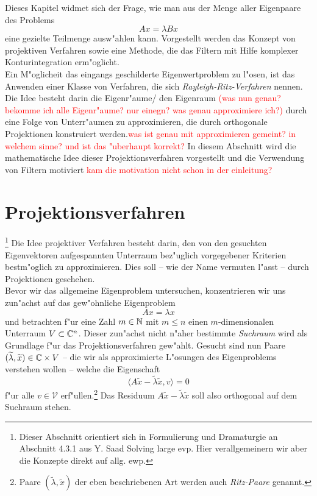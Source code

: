 Dieses Kapitel widmet sich der Frage, wie man aus der Menge aller Eigenpaare
des Problems
\[
Ax = \lambda Bx
\]
eine gezielte Teilmenge ausw"ahlen kann. Vorgestellt werden das Konzept von projektiven Verfahren
sowie eine Methode, die das Filtern mit Hilfe komplexer Konturintegration erm"oglicht.\\

Ein M"oglicheit das eingangs geschilderte Eigenwertproblem zu l"osen, ist
das Anwenden einer Klasse von Verfahren, die sich \emph{Rayleigh-Ritz-Verfahren}
nennen. Die Idee besteht darin die Eigenr"aume/ den Eigenraum \textcolor{red}{(was nun genau? bekomme ich alle
Eigenr"aume? nur einegn? was genau approximiere ich?)} durch eine Folge von Unterr"aumen
zu approximieren, die durch orthogonale Projektionen konstruiert werden.\textcolor{red}{was ist genau
mit approximieren gemeint? in welchem sinne? und ist das "uberhaupt korrekt?} In diesem
Abschnitt wird die mathematische Idee dieser Projektionsverfahren vorgestellt und
die Verwendung von Filtern motiviert \textcolor{red}{kam die motivation nicht schon
in der einleitung?}

\section{Projektionsverfahren}
\footnote{Dieser Abschnitt orientiert sich in Formulierung und Dramaturgie an Abschnitt 4.3.1 aus Y. Saad Solving large evp. Hier verallgemeinern wir aber die Konzepte direkt auf allg. ewp.}
Die Idee projektiver Verfahren besteht darin, den von den gesuchten Eigenvektoren aufgespannten
Unterraum bez"uglich vorgegebener Kriterien bestm"oglich zu approximieren. Dies soll --
wie der Name vermuten l"asst -- durch Projektionen geschehen.\\

Bevor wir das allgemeine Eigenproblem untersuchen, konzentrieren wir uns zun"achst auf das gew"ohnliche Eigenproblem
\[
Ax = \lambda x%
\]
und betrachten f"ur eine Zahl $m\in\mathbb{N}$ mit $m\le n$
einen $m$-dimensionalen Unterraum $V\subset\mathbb{C}^n$. Dieser zun"achst nicht
n"aher bestimmte \emph{Suchraum} wird als Grundlage f"ur das Projektionsverfahren gew"ahlt.
Gesucht sind nun Paare $(\widetilde{\lambda}, \widetilde{x})\in\mathbb{C}\times V$ -- die wir als approximierte L"osungen des Eigenproblems verstehen wollen --
welche die Eigenschaft
\begin{equation}\label{eq:orthogonal}
\langle A\widetilde{x} - \widetilde{\lambda}\widetilde{x}, v\rangle=0
\end{equation}
f"ur alle $v \in \mathcal{V} $ erf"ullen.\footnote{Paare $(\widetilde{\lambda}, \widetilde{x})$ der
eben beschriebenen Art werden auch \emph{Ritz-Paare} genannt.}
Das Residuum $A\widetilde{x} - \widetilde{\lambda}\widetilde{x}$
soll also orthogonal auf dem Suchraum stehen.\\%


